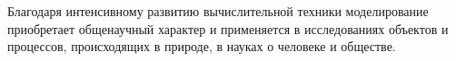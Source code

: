 %
%
%
%
%
%
%
%
%
%
%
%
%
%
%

Благодаря интенсивному развитию вычислительной техники моделирование приобретает общенаучный характер и применяется в исследованиях объектов и процессов, происходящих в природе, в науках о человеке и обществе.

